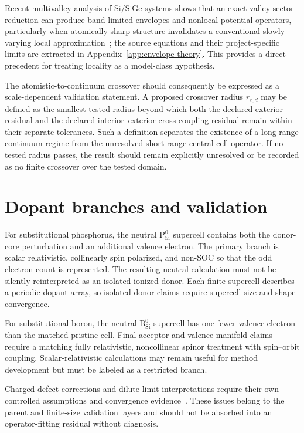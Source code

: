 Recent multivalley analysis of Si/SiGe systems shows that an exact
valley-sector reduction can produce band-limited envelopes and nonlocal
potential operators, particularly when atomically sharp structure invalidates
a conventional slowly varying local approximation~\cite{ermoneit2026}; the
source equations and their project-specific limits are extracted in
Appendix~\ref{app:envelope-theory}. This provides a direct precedent for treating
locality as a model-class hypothesis.

The atomistic-to-continuum crossover should consequently be expressed as a
scale-dependent validation statement. A proposed crossover radius $r_{c,d}$
may be defined as the smallest tested radius beyond which both the declared
exterior residual and the declared interior--exterior cross-coupling residual
remain within their separate tolerances. Such a definition separates the
existence of a long-range
continuum regime from the unresolved short-range central-cell operator. If no
tested radius passes, the result should remain explicitly unresolved or be
recorded as no finite crossover over the tested domain.

\section{Dopant branches and validation}


For substitutional phosphorus, the neutral $\mathrm P_{\mathrm{Si}}^0$
supercell contains both the donor-core perturbation and an additional valence
electron. The primary branch is scalar relativistic, collinearly spin
polarized, and non-SOC so that the odd electron count is represented. The
resulting neutral calculation must not be silently reinterpreted
as an isolated ionized donor. Each finite supercell describes a periodic dopant
array, so isolated-donor claims require supercell-size and shape convergence.

For substitutional boron, the neutral $\mathrm B_{\mathrm{Si}}^0$ supercell has
one fewer valence electron than the matched pristine cell. Final acceptor and
valence-manifold claims require a matching fully relativistic, noncollinear
spinor treatment with spin--orbit coupling. Scalar-relativistic calculations
may remain useful for method development but
must be labeled as a restricted branch.

Charged-defect corrections and dilute-limit interpretations require their own
controlled assumptions and convergence evidence~\cite{freysoldt2009,freysoldt2014}.
These issues belong to the parent and finite-size validation layers and should
not be absorbed into an operator-fitting residual without diagnosis.

